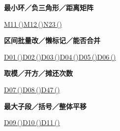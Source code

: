 \documentclass[10pt,a4paper]{article}
\newcommand{\grouphead}[1]{\needspace{7\baselineskip}\par\vspace{7pt}{\large\bfseries #1}\par\vspace{5pt}}
\begin{document}
\begin{minipage}{\linewidth}\textbf{最小环／负三角形／距离矩阵}\par{\fontsize{9.5}{12}\selectfont \hyperref[M11]{M11\,(\pageref*{M11})}\hspace{.5em}\allowbreak \hyperref[M12]{M12\,(\pageref*{M12})}\hspace{.5em}\allowbreak \hyperref[N23]{N23\,(\pageref*{N23})}}\end{minipage}\par\vspace{5pt}
\grouphead{区间、树与平面查询}
\begin{minipage}{\linewidth}\textbf{区间批量改／懒标记／能否合并}\par{\fontsize{9.5}{12}\selectfont \hyperref[D01]{D01\,(\pageref*{D01})}\hspace{.5em}\allowbreak \hyperref[D02]{D02\,(\pageref*{D02})}\hspace{.5em}\allowbreak \hyperref[D03]{D03\,(\pageref*{D03})}\hspace{.5em}\allowbreak \hyperref[D04]{D04\,(\pageref*{D04})}\hspace{.5em}\allowbreak \hyperref[D05]{D05\,(\pageref*{D05})}\hspace{.5em}\allowbreak \hyperref[D06]{D06\,(\pageref*{D06})}}\end{minipage}\par\vspace{5pt}
\begin{minipage}{\linewidth}\textbf{取模／开方／摊还次数}\par{\fontsize{9.5}{12}\selectfont \hyperref[D07]{D07\,(\pageref*{D07})}\hspace{.5em}\allowbreak \hyperref[D08]{D08\,(\pageref*{D08})}\hspace{.5em}\allowbreak \hyperref[D47]{D47\,(\pageref*{D47})}}\end{minipage}\par\vspace{5pt}
\begin{minipage}{\linewidth}\textbf{最大子段／括号／整体平移}\par{\fontsize{9.5}{12}\selectfont \hyperref[D09]{D09\,(\pageref*{D09})}\hspace{.5em}\allowbreak \hyperref[D10]{D10\,(\pageref*{D10})}\hspace{.5em}\allowbreak \hyperref[D11]{D11\,(\pageref*{D11})}}\end{minipage}\par\vspace{5pt}
\end{document}
